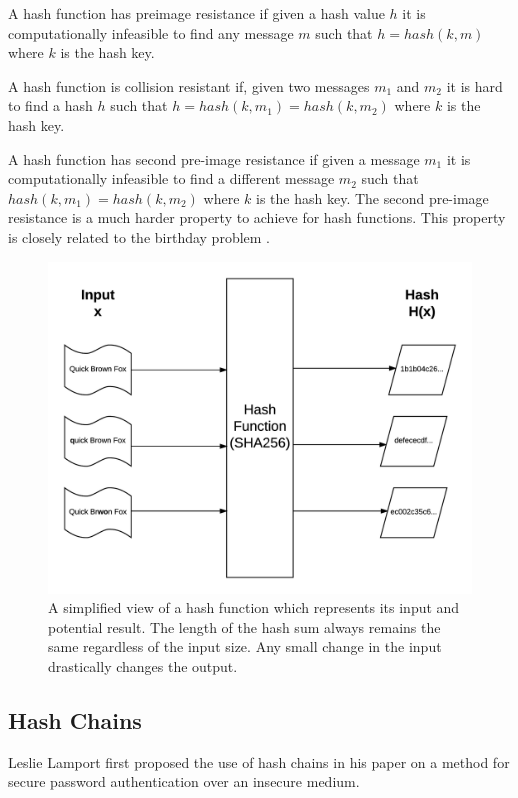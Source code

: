 \documentclass{sig-alternate-05-2015}
\begin{document}
 A hash function has preimage resistance if given a hash value $h$ it is computationally infeasible to find any message $m$ such that $h = hash(k,m)$ where $k$ is the hash key.
 
 A hash function is collision resistant if, given two messages $m_{1}$ and $m_{2}$ it is hard to find a hash $h$ such that $h = hash(k,m_{1}) = hash(k,m_{2})$ where $k$ is the hash key.
 
 A hash function has second pre-image resistance if given a message $m_{1}$ it is computationally infeasible to find a different message  $m_{2}$ such that $hash(k,m_{1}) = hash(k,m_{2})$ where $k$ is the hash key. The second pre-image resistance is a much harder property to achieve for hash functions. This property is closely related to the birthday problem \cite{lesser_exploring_1999}.
 
 \begin{figure}[hbtp]
 \includegraphics[scale=0.55]{hash_function.png}
 \caption{A simplified view of a hash function which represents its input and potential result. The length of the hash sum always remains the same regardless of the input size. Any small change in the input drastically changes the output.}
 \end{figure}
 


\subsection*{Hash Chains \cite{horne_hash_2011}}

Leslie Lamport \cite{lamport_password_1981} first proposed the use of hash chains in his paper on a method for secure password authentication over an insecure medium.
\end{document}
